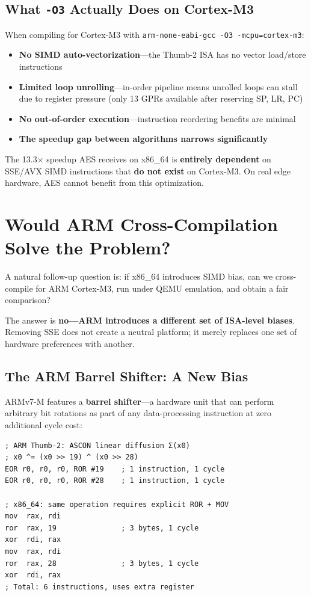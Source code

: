 \documentclass[11pt,a4paper]{article}
\begin{document}
\subsection{What {\tt -O3} Actually Does on Cortex-M3}

When compiling for Cortex-M3 with {\tt arm-none-eabi-gcc -O3 -mcpu=cortex-m3}:

\begin{itemize}
    \item \textbf{No SIMD auto-vectorization}---the Thumb-2 ISA has no vector load/store instructions
    \item \textbf{Limited loop unrolling}---in-order pipeline means unrolled loops can stall due to register pressure (only 13 GPRs available after reserving SP, LR, PC)
    \item \textbf{No out-of-order execution}---instruction reordering benefits are minimal
    \item \textbf{The speedup gap between algorithms narrows significantly}
\end{itemize}

The 13.3$\times$ speedup AES receives on x86\_64 is \textbf{entirely dependent} on SSE/AVX SIMD instructions that \textbf{do not exist} on Cortex-M3. On real edge hardware, AES cannot benefit from this optimization.

\section{Would ARM Cross-Compilation Solve the Problem?}

A natural follow-up question is: if x86\_64 introduces SIMD bias, can we cross-compile for ARM Cortex-M3, run under QEMU emulation, and obtain a fair comparison?

The answer is \textbf{no---ARM introduces a different set of ISA-level biases}. Removing SSE does not create a neutral platform; it merely replaces one set of hardware preferences with another.

\subsection{The ARM Barrel Shifter: A New Bias}

ARMv7-M features a \textbf{barrel shifter}---a hardware unit that can perform arbitrary bit rotations as part of any data-processing instruction at zero additional cycle cost:

\begin{lstlisting}[language={[x86masm]Assembler}]
; ARM Thumb-2: ASCON linear diffusion Σ(x0)
; x0 ^= (x0 >> 19) ^ (x0 >> 28)
EOR r0, r0, r0, ROR #19    ; 1 instruction, 1 cycle
EOR r0, r0, r0, ROR #28    ; 1 instruction, 1 cycle

; x86_64: same operation requires explicit ROR + MOV
mov  rax, rdi
ror  rax, 19               ; 3 bytes, 1 cycle
xor  rdi, rax
mov  rax, rdi
ror  rax, 28               ; 3 bytes, 1 cycle
xor  rdi, rax
; Total: 6 instructions, uses extra register
\end{lstlisting}
\end{document}
